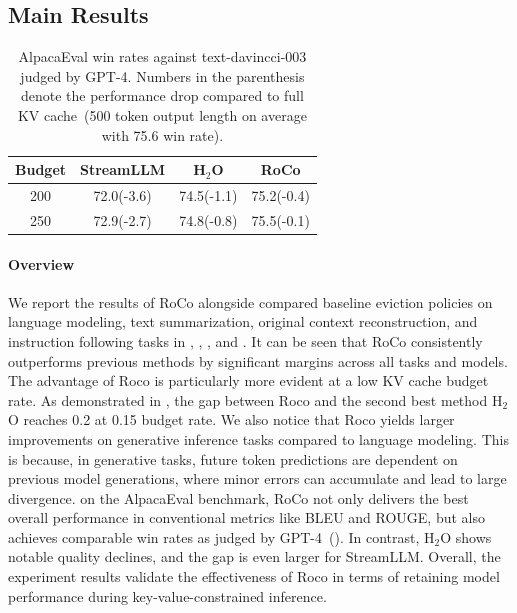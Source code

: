 \subsection{Main Results}
\begin{table}[t]
    \centering
    \small
    \begin{tabular}{cccc}
    \toprule
    \textbf{Budget} & \textbf{StreamLLM} & \textbf{H$_{\text{2}}$O} & \textbf{RoCo} \\
    \midrule
    200              & 72.0(-3.6)               & 74.5(-1.1)         & 75.2(-0.4)          \\
    250              & 72.9(-2.7)               & 74.8(-0.8)         & 75.5(-0.1)          \\
    \bottomrule
    \end{tabular}
    \caption{AlpacaEval win rates against text-davincci-003 judged by GPT-4. Numbers in the parenthesis denote the performance drop compared to full KV cache~(500 token output length on average with 75.6 win rate).}
    \label{table:gpt4}
\end{table}
\paragraph{Overview} We report the results of RoCo alongside compared baseline eviction policies on language modeling, text summarization, original context reconstruction, and instruction following tasks in , , , and . 
It can be seen that RoCo consistently outperforms previous methods by significant margins across all tasks and models. The advantage of Roco is particularly more evident at a low KV cache budget rate. As demonstrated in , the gap between Roco and the second best method H$_{\text{2}}$O reaches 0.2 at 0.15 budget rate. We also notice that Roco yields larger improvements on generative inference tasks compared to language modeling. This is because, in generative tasks, future token predictions are dependent on previous model generations, where minor errors can accumulate and lead to large divergence. 
on the AlpacaEval benchmark, RoCo not only delivers the best overall performance in conventional metrics like BLEU and ROUGE, but also achieves comparable win rates as judged by GPT-4~(). In contrast, H$_{\text{2}}$O shows notable quality declines, and the gap is even larger for StreamLLM. Overall, the experiment results validate the effectiveness of Roco in terms of retaining model performance during key-value-constrained inference.
